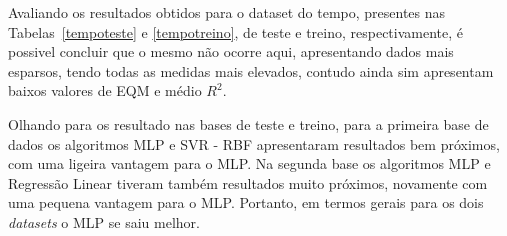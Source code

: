 Avaliando os resultados obtidos para o dataset do tempo, presentes nas Tabelas~\ref{tempoteste} e \ref{tempotreino}, de teste e treino, respectivamente, é possivel concluir que o mesmo não ocorre aqui, apresentando dados mais esparsos, tendo todas as medidas mais elevados, contudo ainda sim apresentam baixos valores de EQM e médio $R^2$.

Olhando para os resultado nas bases de teste e treino, para a primeira base de dados os algoritmos MLP e SVR - RBF apresentaram resultados bem próximos, com uma ligeira vantagem para o MLP. Na segunda base os algoritmos MLP e Regressão Linear tiveram também resultados muito próximos, novamente com uma pequena vantagem para o MLP. Portanto, em termos gerais para os dois \textit{datasets} o MLP se saiu melhor.

